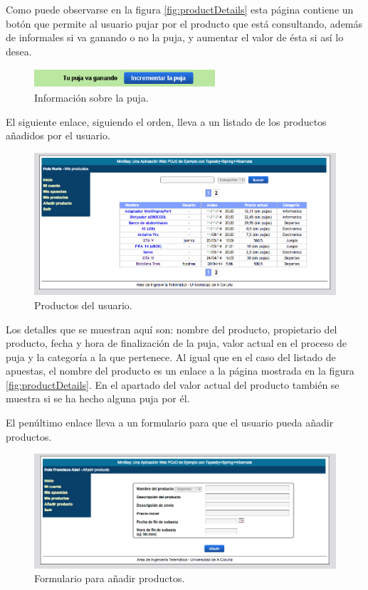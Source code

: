 \documentclass[12pt,a4paper,twoside,spanish]{article}      %
\begin{document}
Como puede observarse en la figura \ref{fig:productDetails} esta página contiene un botón que permite al usuario pujar por el
producto que está consultando, además de informales si va ganando o no la puja, y aumentar el valor de ésta si así lo desea.

\begin{figure}[H]
  \centering
    \includegraphics[width=0.6\textwidth]{puja_ganadora.png}
  \caption{Información sobre la puja.}
  \label{fig:winBid}
\end{figure}

El siguiente enlace, siguiendo el orden, lleva a un listado de los productos añadidos por el usuario.

\begin{figure}[H]
  \centering
    \includegraphics[width=1\textwidth]{mis_productos.png}
  \caption{Productos del usuario.}
  \label{fig:myProducts}
\end{figure}

Los detalles que se muestran aquí son: nombre del producto, propietario del producto, fecha y hora de finalización de la puja,
valor actual en el proceso de puja y la categoría a la que pertenece. Al igual que en el caso del listado de apuestas, el nombre
del producto es un enlace a la página mostrada en la figura \ref{fig:productDetails}. En el apartado del valor actual del
producto también se muestra si se ha hecho alguna puja por él.

El penúltimo enlace lleva a un formulario para que el usuario pueda añadir productos.

\begin{figure}[H]
  \centering
    \includegraphics[width=1\textwidth]{anadir_producto.png}
  \caption{Formulario para añadir productos.}
  \label{fig:addProduct}
\end{figure}
\end{document}
